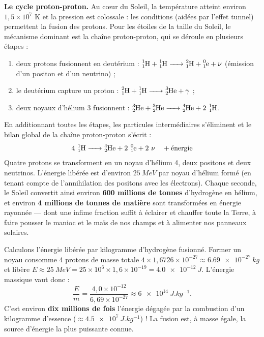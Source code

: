 \documentclass[11pt]{article}
\newcommand{\cle}[1]{{\popxbold\color{popdark}#1}}
\begin{document}
\textbf{Le cycle proton-proton.} Au cœur du Soleil, la température atteint environ $1,5\times 10^7$ K et la pression est colossale : les conditions (aidées par l'effet tunnel) permettent la fusion des protons. Pour les étoiles de la taille du Soleil, le mécanisme dominant est la \cle{chaîne proton-proton}, qui se déroule en plusieurs étapes :
\begin{enumerate}
\item deux protons fusionnent en deutérium : $\ce{^{1}_{1}H + ^{1}_{1}H -> ^{2}_{1}H + ^{0}_{1}e + \nu}$ (émission d'un positon et d'un neutrino) ;
\item le deutérium capture un proton : $\ce{^{2}_{1}H + ^{1}_{1}H -> ^{3}_{2}He + \gamma}$ ;
\item deux noyaux d'hélium 3 fusionnent : $\ce{^{3}_{2}He + ^{3}_{2}He -> ^{4}_{2}He + 2\,^{1}_{1}H}$.
\end{enumerate}

\begin{aretenir}
En additionnant toutes les étapes, les particules intermédiaires s'éliminent et le bilan global de la chaîne proton-proton s'écrit :
\[ \ce{4\,^{1}_{1}H -> ^{4}_{2}He + 2\,^{0}_{1}e + 2\,\nu} \quad + \text{énergie} \]
Quatre protons se transforment en un noyau d'hélium 4, deux positons et deux neutrinos. L'énergie libérée est d'environ $\SI{25}{MeV}$ par noyau d'hélium formé (en tenant compte de l'annihilation des positons avec les électrons). Chaque seconde, le Soleil convertit ainsi environ \textbf{600 millions de tonnes} d'hydrogène en hélium, et environ \textbf{4 millions de tonnes de matière} sont transformées en énergie rayonnée — dont une infime fraction suffit à éclairer et chauffer toute la Terre, à faire pousser le manioc et le maïs de nos champs et à alimenter nos panneaux solaires.
\end{aretenir}

\begin{exemplebox}
Calculons l'énergie libérée par kilogramme d'hydrogène fusionné. Former un noyau  consomme 4 protons de masse totale $4 \times 1{,}6726\times 10^{-27} \approx \SI{6,69e-27}{kg}$ et libère $E \approx \SI{25}{MeV} = 25\times 10^6 \times 1{,}6\times 10^{-19} = \SI{4,0e-12}{J}$. L'énergie massique vaut donc :
\[ \frac{E}{m} = \frac{4{,}0\times 10^{-12}}{6{,}69\times 10^{-27}} \approx \SI{6e14}{J.kg^{-1}}. \]
C'est environ \textbf{dix millions de fois} l'énergie dégagée par la combustion d'un kilogramme d'essence ($\approx \SI{4,5e7}{J.kg^{-1}}$) ! La fusion est, à masse égale, la source d'énergie la plus puissante connue.
\end{exemplebox}
\end{document}

